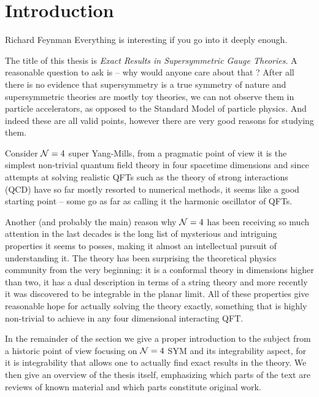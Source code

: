 
\section{Introduction}

\begin{chapquote}{Richard Feynman}
Everything is interesting if you go into it deeply enough.
\end{chapquote}

\noindent The title of this thesis is \emph{Exact Results in Supersymmetric Gauge Theories}. A reasonable question to ask is -- why would anyone care about that ? 
After all there is no evidence that supersymmetry is a true symmetry of nature and supersymmetric theories are mostly toy theories, we can not observe them in particle accelerators, as opposed to the Standard Model of particle physics. 
And indeed these are all valid points, however there are very good reasons for studying them. 

Consider $\mathcal{N}=4$ super Yang-Mills, from a pragmatic point of view it is the simplest non-trivial quantum field theory in four spacetime dimensions and since attempts at solving realistic QFTs such as the theory of strong interactions (QCD) have so far mostly resorted to numerical methods, it seems like a good starting point -- some go as far as calling it the harmonic oscillator of QFTs. 

Another (and probably the main) reason why $\mathcal{N}=4$ has been receiving so much attention in the last decades is the long list of mysterious and intriguing properties it seems to posses, making it almost an intellectual pursuit of understanding it. 
The theory has been surprising the theoretical physics community from the very beginning: it is a conformal theory in dimensions higher than two, it has a dual description in terms of a string theory and more recently it was discovered to be integrable in the planar limit. 
All of these properties give reasonable hope for actually solving the theory exactly, something that is highly non-trivial to achieve in any four dimensional interacting QFT.

In the remainder of the section we give a proper introduction to the subject from a historic point of view focusing on $\mathcal{N}=4$ SYM and its integrability aspect, for it is integrability that allows one to actually find exact results in the theory. We then give an overview of the thesis itself, emphasizing which parts of the text are reviews of known material and which parts constitute original work.

